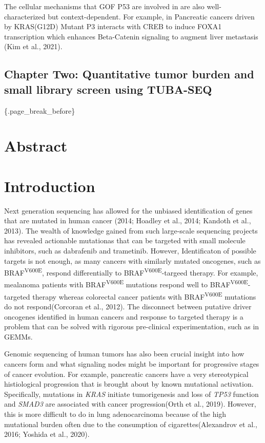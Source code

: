 The cellular mechanisms that GOF P53 are involved in are also well-characterized but context-dependent. For example, in Pancreatic cancers driven by KRAS(G12D) Mutant P3 interacts with CREB to induce FOXA1 transcription which enhances Beta-Catenin signaling to augment liver metastasis (Kim et al., 2021).

\hypertarget{chapter-two-quantitative-tumor-burden-and-small-library-screen-using-tuba-seq}{%
\subsection{Chapter Two: Quantitative tumor burden and small library screen using TUBA-SEQ}\label{chapter-two-quantitative-tumor-burden-and-small-library-screen-using-tuba-seq}}

\{.page\_break\_before\}

\hypertarget{abstract}{%
\section{Abstract}\label{abstract}}

\hypertarget{introduction}{%
\section{Introduction}\label{introduction}}

Next generation sequencing has allowed for the unbiased identification of genes that are mutated in human cancer (2014; Hoadley et al., 2014; Kandoth et al., 2013).
The wealth of knowledge gained from such large-scale sequencing projects has revealed actionable mutationas that can be targeted with small molecule inhibitors, such as dabrafenib and trametinib.
However, Identificaton of possible targets is not enough, as many cancers with similarly mutated oncogenes, such as BRAF\textsuperscript{V600E}, respond differentially to BRAF\textsuperscript{V600E}-targeed therapy.
For example, mealanoma patients with BRAF\textsuperscript{V600E} mutations respond well to BRAF\textsuperscript{V600E}-targeted therapy whereas colorectal cancer patients with BRAF\textsuperscript{V600E} mutations do not respond(Corcoran et al., 2012).
The disconnect between putative driver oncogenes identified in human cancers and response to targeted therapy is a problem that can be solved with rigorous pre-clinical experimentation, such as in GEMMs.

Genomic sequencing of human tumors has also been crucial insight into how cancers form and what signaling nodes might be important for progressive stages of cancer evolution.
For example, pancreatic cancers have a very stereotypical histiological progression that is brought about by known mutational activation.
Specifically, mutations in \emph{KRAS} initiate tumorigenesis and loss of \emph{TP53} function and \emph{SMAD3} are associated with cancer progression(Orth et al., 2019).
However, this is more difficult to do in lung adenocarcinoma because of the high mutational burden often due to the consumption of cigarettes(Alexandrov et al., 2016; Yoshida et al., 2020).

